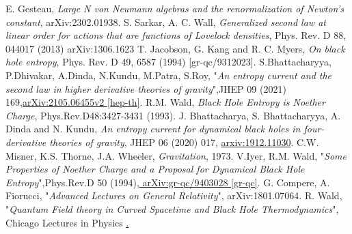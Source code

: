 \documentclass[12pt]{article}
\begin{document}
\begin{thebibliography}{100}
 E. Gesteau, \emph{Large N von Neumann algebras and the renormalization of Newton's constant}, arXiv:2302.01938.
 S. Sarkar, A. C. Wall, \emph{Generalized second law at linear order for actions that are functions of Lovelock densities}, Phys. Rev. D 88, 044017 (2013) arXiv:1306.1623
 T. Jacobson, G. Kang and R. C. Myers, \emph{On black hole entropy}, Phys.
Rev. D 49, 6587 (1994) [gr-qc/9312023].
  S.Bhattacharyya, P.Dhivakar, A.Dinda, N.Kundu, M.Patra, S.Roy, "\textit{An entropy current and the second law in higher derivative theories of gravity}",JHEP 09 (2021) 169,\href{https://arxiv.org/abs/2105.06455}{arXiv:2105.06455v2 [hep-th]}.
  R.M. Wald, \emph{Black Hole Entropy is Noether Charge}, Phys.Rev.D48:3427-3431 (1993).
 J. Bhattacharya, S. Bhattacharyya, A. Dinda and N. Kundu, \emph{An entropy current for dynamical black
holes in four-derivative theories of gravity}, JHEP 06 (2020) 017, \href{https://arxiv.org/abs/1912.11030}{arxiv:1912.11030}.
 C.W. Misner, K.S. Thorne, J.A. Wheeler, \emph{Gravitation}, 1973.
  V.Iyer, R.M. Wald, "\textit{Some Properties of Noether Charge and a Proposal for Dynamical Black Hole Entropy}",Phys.Rev.D 50 (1994),\href{https://arxiv.org/abs/gr-qc/9403028}{	arXiv:gr-qc/9403028 [gr-qc]}.
   G. Compere, A. Fiorucci, "\textit{Advanced Lectures on General Relativity}", arXiv:1801.07064.
    R. Wald, "\textit{Quantum Field theory in Curved Spacetime and Black Hole Thermodynamics}", Chicago Lectures in Physics \href{https://inspirehep.net/literature/400377}.


\end{thebibliography}
\end{document}

